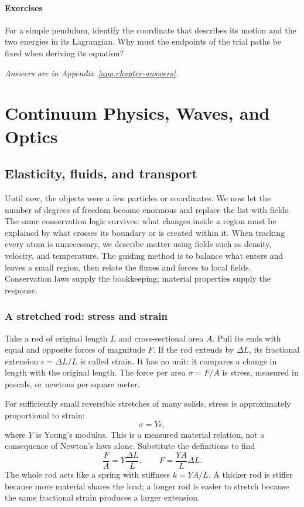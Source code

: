 \documentclass[11pt,oneside]{book}
\theoremstyle{reviewstyle}
\newcommand{\learningcheck}[1]{\subsection*{Exercises}\noindent #1\par\smallskip\noindent\emph{Answers are in Appendix~\ref{app:chapter-answers}.}}
\begin{document}
\learningcheck{For a simple pendulum, identify the coordinate that describes its motion and the two energies in its Lagrangian. Why must the endpoints of the trial paths be fixed when deriving its equation?}

\part{Continuum Physics, Waves, and Optics}
\chapter{Elasticity, fluids, and transport}
Until now, the objects were a few particles or coordinates. We now let the number of degrees of freedom become enormous and replace the list with fields. The same conservation logic survives: what changes inside a region must be explained by what crosses its boundary or is created within it.
When tracking every atom is unnecessary, we describe matter using fields such as density, velocity, and temperature. The guiding method is to balance what enters and leaves a small region, then relate the fluxes and forces to local fields. Conservation laws supply the bookkeeping; material properties supply the response.

\section{A stretched rod: stress and strain}
Take a rod of original length $L$ and cross-sectional area $A$. Pull its ends with equal and opposite forces of magnitude $F$. If the rod extends by $\Delta L$, its fractional extension $\epsilon=\Delta L/L$ is called strain. It has no unit: it compares a change in length with the original length. The force per area $\sigma=F/A$ is stress, measured in pascals, or newtons per square meter.

For sufficiently small reversible stretches of many solids, stress is approximately proportional to strain:
\begin{equation}
\sigma=Y\epsilon,
\end{equation}
where $Y$ is Young's modulus. This is a measured material relation, not a consequence of Newton's laws alone. Substitute the definitions to find
\begin{equation}
\frac FA=Y\frac{\Delta L}{L},
\qquad F=\frac{YA}{L}\Delta L.
\end{equation}
The whole rod acts like a spring with stiffness $k=YA/L$. A thicker rod is stiffer because more material shares the load; a longer rod is easier to stretch because the same fractional strain produces a larger extension.
\end{document}
